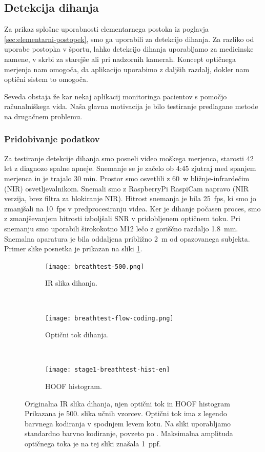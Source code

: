 \subsection{Detekcija dihanja}
Za prikaz splošne uporabnosti elementarnega postoka iz poglavja \ref{sec:elementarni-postopek}, smo ga uporabili za detekcijo dihanja. Za razliko od uporabe postopka v športu, lahko detekcijo dihanja uporabljamo za medicinske namene, v skrbi za starejše ali pri nadzornih kamerah. Koncept optičnega merjenja nam omogoča, da aplikacijo uporabimo z daljših razdalj, dokler nam optični sistem to omogoča. 

Seveda obstaja že kar nekaj aplikacij monitoringa pacientov s pomočjo računalniškega vida. Naša glavna motivacija je bilo testiranje predlagane metode na drugačnem problemu.

\subsubsection{Pridobivanje podatkov}
Za testiranje detekcije dihanja smo posneli video moškega merjenca, starosti 42 let z diagnozo spalne apneje. Snemanje se je začelo ob 4:45 zjutraj med spanjem merjenca in je trajalo 30 min. Prostor smo osvetlili z \SI{60}{w} bližnje-infrardečim (NIR) osvetljevalnikom. Snemali smo z RaspberryPi RaspiCam  napravo (NIR verzija, brez filtra za blokiranje NIR). Hitrost snemanja je bila \SI{25}{fps}, ki smo jo zmanjšali na \SI{10}{fps} v predprocesiranju videa. Ker je dihanje počasen proces, smo z zmanjševanjem hitrosti izboljšali SNR v pridobljenem optičnem toku. Pri snemanju smo uporabili širokokotno M12 lečo z goriščno razdaljo \SI{1.8}{mm}. Snemalna aparatura je bila oddaljena približno \SI{2}{m} od opazovanega subjekta. Primer slike posnetka je prikazan na sliki \ref{fig:dihanje-orig}.

\begin{figure}[htb]
	\centering
	\begin{subfigure}[t]{0.45\columnwidth}
		\centering
		\texttt{[image: breathtest-500.png]}
		\caption{IR slika dihanja.}
		\label{fig:dihanje-orig}
	\end{subfigure}
	~
	\begin{subfigure}[t]{0.45\columnwidth}
		\centering
		\texttt{[image: breathtest-flow-coding.png]}
		\caption{Optični tok dihanja.}
		\label{fig:dihanje-of}
	\end{subfigure}
	~
	\begin{subfigure}[t]{0.45\columnwidth}
		\centering
		\texttt{[image: stage1-breathtest-hist-en]}
		\caption{HOOF histogram.}
		\label{fig:dihanje-hist}
	\end{subfigure}
	\caption[Originalna IR slika dihanja, njen optični tok in HOOF histogram]{Originalna IR slika dihanja, njen optični tok in HOOF histogram Prikazana je 500. slika učnih vzorcev. Optični tok ima z legendo barvnega kodiranja v spodnjem levem kotu. Na sliki uporabljamo standardno barvno kodiranje, povzeto po \cite{baker2011database}. Maksimalna amplituda optičnega toka je na tej sliki znašala \SI{1}{ppf}.}
	\label{fig:dihanje}
\end{figure} 

